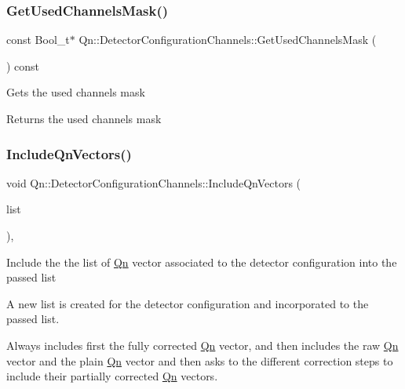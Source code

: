 \subsubsection{\texorpdfstring{Get\+Used\+Channels\+Mask()}{GetUsedChannelsMask()}}
{\footnotesize\ttfamily const Bool\+\_\+t$\ast$ Qn\+::\+Detector\+Configuration\+Channels\+::\+Get\+Used\+Channels\+Mask (\begin{DoxyParamCaption}{ }\end{DoxyParamCaption}) const\hspace{0.3cm}{\ttfamily [inline]}}

Gets the used channels mask \begin{DoxyReturn}{Returns}
the used channels mask 
\end{DoxyReturn}
\mbox{\label{classQn_1_1DetectorConfigurationChannels_a6756b2b2bed25bee5659953ae82ce5b7}} 
\subsubsection{\texorpdfstring{Include\+Qn\+Vectors()}{IncludeQnVectors()}}
{\footnotesize\ttfamily void Qn\+::\+Detector\+Configuration\+Channels\+::\+Include\+Qn\+Vectors (\begin{DoxyParamCaption}\item[{T\+List $\ast$}]{list }\end{DoxyParamCaption})\hspace{0.3cm}{\ttfamily [inline]}, {\ttfamily [virtual]}}

Include the the list of \mbox{\hyperlink{namespaceQn}{Qn}} vector associated to the detector configuration into the passed list

A new list is created for the detector configuration and incorporated to the passed list.

Always includes first the fully corrected \mbox{\hyperlink{namespaceQn}{Qn}} vector, and then includes the raw \mbox{\hyperlink{namespaceQn}{Qn}} vector and the plain \mbox{\hyperlink{namespaceQn}{Qn}} vector and then asks to the different correction steps to include their partially corrected \mbox{\hyperlink{namespaceQn}{Qn}} vectors.

